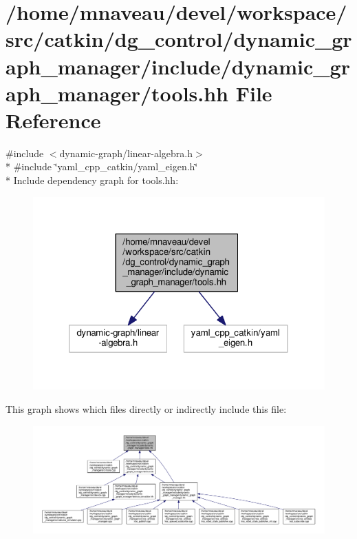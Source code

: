 \hypertarget{tools_8hh}{}\section{/home/mnaveau/devel/workspace/src/catkin/dg\+\_\+control/dynamic\+\_\+graph\+\_\+manager/include/dynamic\+\_\+graph\+\_\+manager/tools.hh File Reference}
\label{tools_8hh}
{\ttfamily \#include $<$dynamic-\/graph/linear-\/algebra.\+h$>$}\\*
{\ttfamily \#include \char`\"{}yaml\+\_\+cpp\+\_\+catkin/yaml\+\_\+eigen.\+h\char`\"{}}\\*
Include dependency graph for tools.\+hh\+:\nopagebreak
\begin{figure}[H]
\begin{center}
\leavevmode
\includegraphics[width=320pt]{tools_8hh__incl}
\end{center}
\end{figure}
This graph shows which files directly or indirectly include this file\+:\nopagebreak
\begin{figure}[H]
\begin{center}
\leavevmode
\includegraphics[width=350pt]{tools_8hh__dep__incl}
\end{center}
\end{figure}
